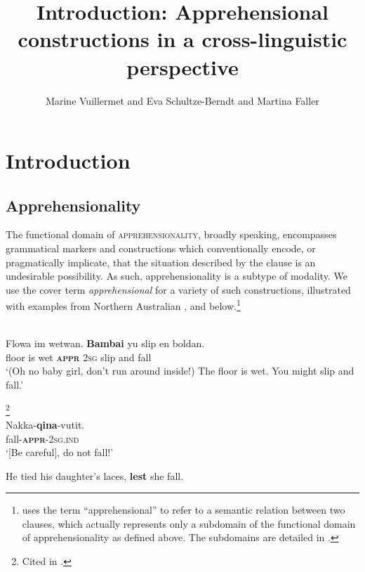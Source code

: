 \documentclass[output=paper,colorlinks,citecolor=brown]{langscibook}
\author{Marine Vuillermet\orcid{}\affiliation{University of Zürich} and
        Eva Schultze-Berndt\affiliation{The University of Manchester} and
        Martina Faller\orcid{}\affiliation{The University of Manchester}}
\title{Introduction: Apprehensional constructions in a cross-linguistic perspective}
\begin{document}
\maketitle



\section{Introduction}
\label{introintro}

\subsection{Apprehensionality}
\label{subsec:appr}

The functional domain of \textsc{apprehensionality}, broadly speaking, encompasses grammatical markers and constructions which conventionally encode, or pragmatically implicate, that the situation described by the clause is an undesirable possibility. As such, apprehensionality is a subtype of modality. We use the cover term \textit{apprehensional} for a variety of such constructions, illustrated with examples from Northern Australian ,  and  below.\footnote{\citet[1333]{croft2022} uses the term ``apprehensional'' to refer to a semantic relation between two clauses, which actually represents only a subdomain of the functional domain of apprehensionality as defined above. The subdomains are detailed in .}


\ea 
\label{ex:intro1} 
\\
\gll Flowa	im	wetwan.	\textbf{Bambai}	yu	slip	en	boldan. \\
floor is wet \textsc{\textbf{appr}} \textsc{2sg} slip and fall \\
\glt `(Oh no baby girl, don't run around inside!) The floor is wet. You might slip and fall.'
\z

\ea 
\label{ex:intro2} 
\textup{\footnote{Cited in \citet[31]{Dobrushina2006}.}}\\
\gll Nakka-\textbf{qina}-vutit. \\
fall-\textsc{\textbf{appr}-2sg.ind} \\
\glt `[Be careful], do not fall!'
\z

\ea\label{ex:intro3} He tied his daughter's laces, \textbf{lest} she fall.
\z
\end{document}
